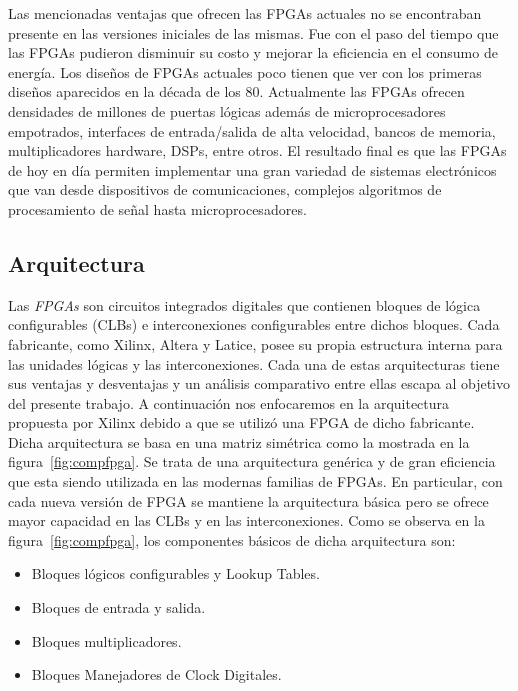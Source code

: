 Las mencionadas ventajas que ofrecen las FPGAs actuales no se
encontraban presente en las versiones iniciales de las mismas. Fue con
el paso del tiempo que las FPGAs pudieron disminuir su costo y mejorar
la eficiencia en el consumo de energía. Los diseños de FPGAs actuales
poco tienen que ver con los primeras diseños aparecidos en la década
de los 80. Actualmente las FPGAs ofrecen densidades de millones de
puertas lógicas además de microprocesadores empotrados, interfaces de
entrada/salida de alta velocidad, bancos de memoria, multiplicadores
hardware, DSPs, entre otros. El resultado final es que las FPGAs de
hoy en día permiten implementar una gran variedad de sistemas
electrónicos que van desde dispositivos de comunicaciones, complejos
algoritmos de procesamiento de señal hasta microprocesadores.


\subsection{Arquitectura}

Las \textit{FPGAs} son circuitos integrados digitales que contienen
bloques de lógica configurables (CLBs) e interconexiones configurables
entre dichos bloques. Cada fabricante, como Xilinx, Altera y Latice,
posee su propia estructura interna para las unidades lógicas y las
interconexiones. Cada una de estas arquitecturas tiene sus ventajas y
desventajas y un análisis comparativo entre ellas escapa al objetivo
del presente trabajo. A continuación nos enfocaremos en la
arquitectura propuesta por Xilinx debido a que se utilizó una FPGA de
dicho fabricante. Dicha arquitectura se basa en una matriz simétrica
como la mostrada en la figura~\ref{fig:compfpga}. Se trata de una
arquitectura genérica y de gran eficiencia que esta siendo utilizada
en las modernas familias de FPGAs. En particular, con cada nueva
versión de FPGA se mantiene la arquitectura básica pero se ofrece
mayor capacidad en las CLBs y en las interconexiones. Como se observa
en la figura~\ref{fig:compfpga}, los componentes básicos de dicha
arquitectura son:

\begin {itemize}
\item  Bloques lógicos configurables y Lookup Tables.
\item  Bloques de entrada y salida.
\item  Bloques multiplicadores.
\item  Bloques Manejadores de Clock Digitales.
\end {itemize}

